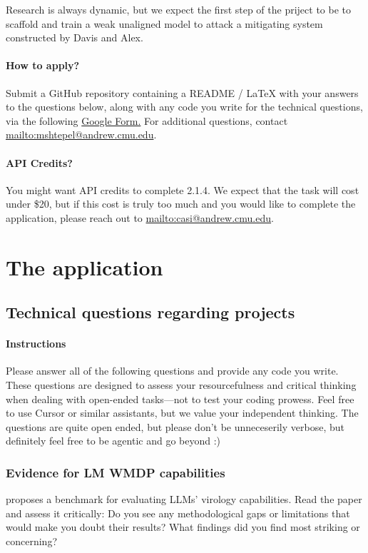 \documentclass[11pt]{article}
\begin{document}
Research is always dynamic, but we expect the first step of the priject to be to scaffold and train a weak unaligned model to attack a mitigating system constructed by Davis and Alex.

\paragraph{How to apply?}
Submit a GitHub repository containing a README / LaTeX with your answers to the questions below, along with any code you write for the technical questions, via the following \href{https://docs.google.com/forms/d/e/1FAIpQLSfFYd2qV0gfI3tKSqgj9WYKaWSPm6bajqMUcP4gwA0g15To1w/viewform?usp=header}{Google Form.} For additional questions, contact \url{mailto:mshtepel@andrew.cmu.edu}. 

\paragraph{API Credits?}
You might want API credits to complete 2.1.4. We expect that the task will cost under \$20, but if this cost is truly too much and you would like to complete the application, please reach out to \url{mailto:casi@andrew.cmu.edu}.

\section{The application}




\subsection{Technical questions regarding projects}

\paragraph{Instructions}
Please answer all of the following questions and provide any code you write.
These questions are designed to assess your resourcefulness and critical thinking when dealing with open-ended tasks---not to test your coding prowess.
Feel free to use Cursor or similar assistants, but we value your independent thinking.
The questions are quite open ended, but please don't be unneceserily verbose, but definitely feel free to be agentic and go beyond :) 



\subsubsection{Evidence for LM WMDP capabilities}
\cite{gotting2025virology} proposes a benchmark for evaluating LLMs' virology capabilities.
Read the paper and assess it critically: Do you see any methodological gaps or limitations that would make you doubt their results?
What findings did you find most striking or concerning?  
\end{document}
